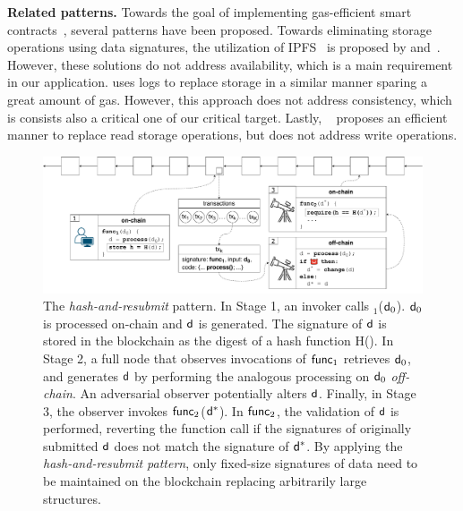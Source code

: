 \noindent \textbf{Related patterns.} Towards the goal of implementing
gas-efficient smart contracts~\cite{contract-opt-1, contract-opt-2,
slither, madmax}, several patterns have been proposed. Towards eliminating
storage operations using data signatures, the utilization of IPFS~\cite{ipfs}
is proposed by \cite{ipfs-1} and~\cite{ipfs-2}. However, these solutions do not
address availability, which is a main requirement in our application.
\cite{logs} uses logs to replace storage in a similar manner sparing a great
amount of gas.  However, this approach does not address consistency, which is
consists also a critical one of our critical target. Lastly,
~\cite{memory-array} proposes an efficient manner to replace read storage
operations, but does not address write operations.


\begin{figure}[h]
    \begin{center} \includegraphics[width=1\textwidth]{figures/har-pattern.pdf}
    \end{center}

    \caption{The \emph{hash-and-resubmit} pattern. In Stage 1, an invoker calls
        \proc$_1$($\mathsf{d}_0$). $\mathsf{d}_0$ is processed on-chain and $\mathsf{d}$ is
        generated. The signature of $\mathsf{d}$ is stored in the blockchain as the
        digest of a hash function \textsf{H}(). In Stage 2, a full node that
        observes invocations of $\textsf{func}_1$ retrieves $\mathsf{d}_0$, and generates
        $\mathsf{d}$ by performing the analogous processing on $\mathsf{d}_0$
        \emph{off-chain}. An adversarial observer potentially alters $\mathsf{d}$.
        Finally, in Stage 3, the observer invokes $\textsf{func}_2$($\mathsf{d}^*$). In
        $\textsf{func}_2$, the validation of $\mathsf{d}$ is performed, reverting the
        function call if the signatures of originally submitted $\mathsf{d}$ does
        not match the signature of $\mathsf{d}^*$. By applying the
        \emph{hash-and-resubmit pattern}, only fixed-size signatures of data
        need to be maintained on the blockchain replacing arbitrarily large
        structures.}

        \label{fig:har-pattern}
\end{figure}

